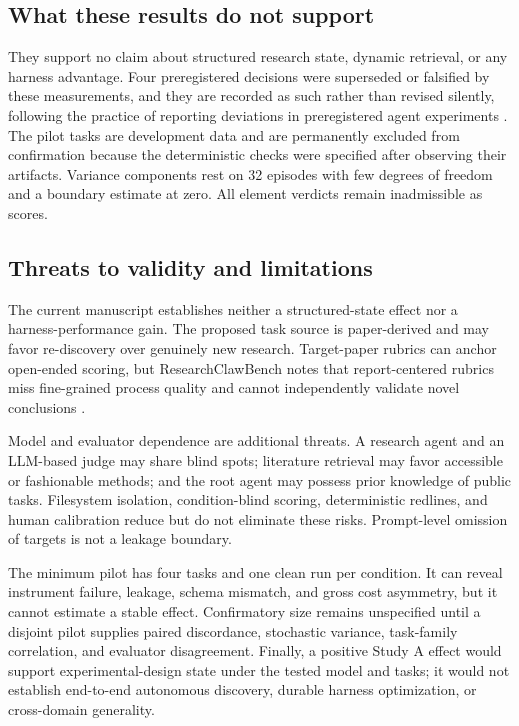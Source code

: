 \documentclass[11pt,a4paper]{article}
\begin{document}
\subsection{What these results do not support}

They support no claim about structured research state, dynamic retrieval, or any
harness advantage.  Four preregistered decisions were superseded or falsified by
these measurements, and they are recorded as such rather than revised silently,
following the practice of reporting deviations in preregistered agent
experiments \citep{prereg2026}.  The pilot tasks are development data and are
permanently excluded from confirmation because the deterministic checks were
specified after observing their artifacts.  Variance components rest on 32
episodes with few degrees of freedom and a boundary estimate at zero.  All
element verdicts remain inadmissible as scores.


\subsection{Threats to validity and limitations}

The current manuscript establishes neither a structured-state effect nor a
harness-performance gain.  The proposed task source is paper-derived and may
favor re-discovery over genuinely new research.  Target-paper rubrics can anchor
open-ended scoring, but ResearchClawBench notes that report-centered rubrics miss
fine-grained process quality and cannot independently validate novel conclusions
\citep{researchclawbench2026}.

Model and evaluator dependence are additional threats.  A research agent and an
LLM-based judge may share blind spots; literature retrieval may favor accessible
or fashionable methods; and the root agent may possess prior knowledge of public
tasks.  Filesystem isolation, condition-blind scoring, deterministic redlines,
and human calibration reduce but do not eliminate these risks.  Prompt-level
omission of targets is not a leakage boundary.

The minimum pilot has four tasks and one clean run per condition.  It can reveal
instrument failure, leakage, schema mismatch, and gross cost asymmetry, but it
cannot estimate a stable effect.  Confirmatory size remains unspecified until a
disjoint pilot supplies paired discordance, stochastic variance, task-family
correlation, and evaluator disagreement.  Finally, a positive Study A effect
would support experimental-design state under the tested model and tasks; it
would not establish end-to-end autonomous discovery, durable harness
optimization, or cross-domain generality.
\end{document}
